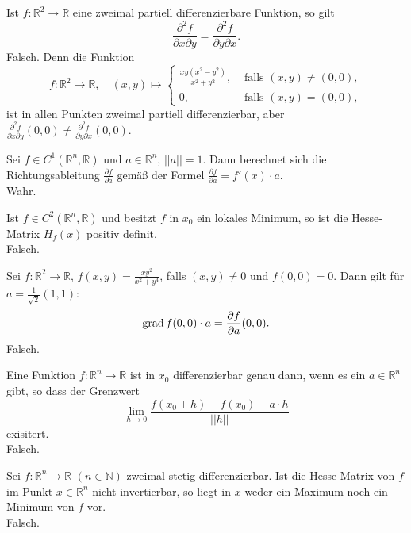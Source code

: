 Ist $f : \mathbb{R}^2 \to \mathbb{R}$ eine zweimal partiell differenzierbare Funktion, so gilt
\begin{displaymath}
  \frac{\partial^2 f}{\partial x \partial y} = \frac{\partial^2 f}{\partial y \partial x}.
\end{displaymath}
Falsch.
Denn die Funktion
\begin{displaymath}
  f : \mathbb{R}^2 \to \mathbb{R}, \quad (x,y) \mapsto
  \begin{cases}
    \frac{xy(x^2 - y^2)}{x^2 + y^2},& \text{ falls } (x,y) \neq (0,0),\\
    0,& \text{ falls } (x,y) = (0,0),
  \end{cases}
\end{displaymath}
ist in allen Punkten zweimal partiell differenzierbar, aber $\frac{\partial^2 f}{\partial x \partial y}(0,0) \neq \frac{\partial^2 f}{\partial y \partial x}(0,0)$.

Sei $f \in C^1(\mathbb{R}^n, \mathbb{R})$ und $a \in \mathbb{R}^n$, $||a|| = 1$.
Dann berechnet sich die Richtungsableitung $\frac{\partial f}{\partial a}$ gemäß der Formel $\frac{\partial f}{\partial a} = f'(x) \cdot a$.\\
Wahr.

Ist $f \in C^2(\mathbb{R}^n, \mathbb{R})$ und besitzt $f$ in $x_0$ ein lokales Minimum, so ist die Hesse-Matrix $H_f(x)$ positiv definit.\\
Falsch.

Sei $f : \mathbb{R}^2 \to \mathbb{R}$, $f(x,y) = \frac{xy^2}{x^2 + y^4}$, falls $(x,y) \neq 0$ und $f(0,0) = 0$.
Dann gilt für $a = \frac{1}{\sqrt{2}}(1,1)$:
\begin{displaymath}
  \operatorname{grad} f(0,0) \cdot a = \frac{\partial f}{\partial a}(0,0).
\end{displaymath}
Falsch.

Eine Funktion $f : \mathbb{R}^n \to \mathbb{R}$ ist in $x_0$ differenzierbar genau dann, wenn es ein $a \in \mathbb{R}^n$ gibt, so dass der Grenzwert
\begin{displaymath}
  \lim_{h \to 0} \frac{f(x_0 + h) - f(x_0) - a \cdot h}{||h||}
\end{displaymath}
exisitert.\\
Falsch.

Sei $f : \mathbb{R}^n \to \mathbb{R}$ $(n \in \mathbb{N})$ zweimal stetig differenzierbar.
Ist die Hesse-Matrix von $f$ im Punkt $x \in \mathbb{R}^n$ nicht invertierbar, so liegt in $x$ weder ein Maximum noch ein Minimum von $f$ vor.\\
Falsch.


